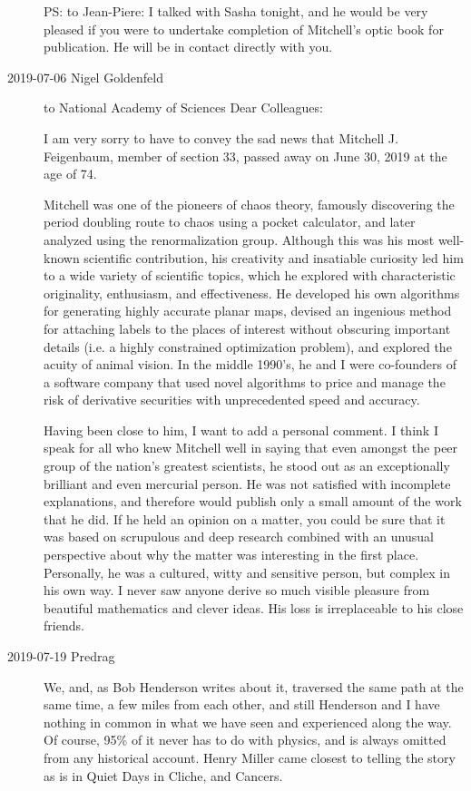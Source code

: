 \begin{description}
PS: to Jean-Piere: I talked with Sasha tonight, and he would be very pleased if
you were to undertake completion of Mitchell's optic book for
publication. He will be in contact directly with you.

\item[2019-07-06 Nigel Goldenfeld]
to
National Academy of Sciences
Dear Colleagues:

I am very sorry to have to convey the sad news that Mitchell J. Feigenbaum,
member of section 33, passed away on June 30, 2019 at the age of 74.

Mitchell was one of the pioneers of chaos theory, famously discovering
the period doubling route to chaos using a pocket calculator, and later
analyzed using the renormalization group.  Although this was his most
well-known scientific contribution, his creativity and insatiable
curiosity led him to a wide variety of scientific topics, which he
explored with characteristic originality, enthusiasm, and effectiveness.
He developed his own algorithms for generating highly accurate planar
maps, devised an ingenious method for attaching labels to the places of
interest without obscuring important details (i.e. a highly constrained
optimization problem), and explored the acuity of animal vision.  In the
middle 1990's, he and I were co-founders of a software company that used
novel algorithms to price and manage the risk of derivative securities
with unprecedented speed and accuracy.

Having been close to him, I want to add a personal comment.  I think I
speak for all who knew Mitchell well in saying that even amongst the peer
group of the nation's greatest scientists, he stood out as an
exceptionally brilliant and even mercurial person.  He was not satisfied
with incomplete explanations, and therefore would publish only a small
amount of the work that he did.  If he held an opinion on a matter, you
could be sure that it was based on scrupulous and deep research combined
with an unusual perspective about why the matter was interesting in the
first place.  Personally, he was a cultured, witty and sensitive person,
but complex in his own way.  I never saw anyone derive so much visible
pleasure from beautiful mathematics and clever ideas.  His loss is
irreplaceable to his close friends.

\item[2019-07-19 Predrag]
We, and, as
{Bob Henderson} writes about it, traversed the same path at the same
time, a few miles from each other, and still Henderson and I have nothing
in common in what we have seen and experienced along the way. Of course,
95\% of it never has to do with physics, and is always omitted from any
historical account. Henry Miller came closest to telling the story as is
in Quiet Days in Cliche, and Cancers.


\end{description}
